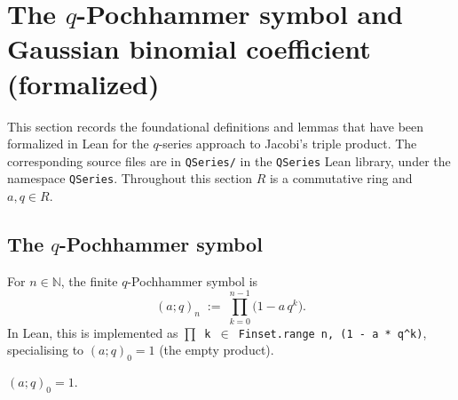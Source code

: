 
\section{The $q$-Pochhammer symbol and Gaussian binomial coefficient (formalized)}
\label{sec:qPochhammer-formalized}

This section records the foundational definitions and lemmas that have been
formalized in Lean for the $q$-series approach to Jacobi's triple product.
The corresponding source files are in \texttt{QSeries/} in the
\texttt{QSeries} Lean library, under the namespace \texttt{QSeries}.
Throughout this section $R$ is a commutative ring and $a, q \in R$.

\subsection{The $q$-Pochhammer symbol}

\begin{definition}\label{def:qPochhammer}\leanok
For $n \in \mathbb{N}$, the finite $q$-Pochhammer symbol is
\[
  (a; q)_n \;:=\; \prod_{k = 0}^{n - 1} \bigl(1 - a\, q^k\bigr).
\]
In Lean, this is implemented as \texttt{$\prod$ k $\in$ Finset.range n, (1 - a * q\^{}k)},
specialising to $(a; q)_0 = 1$ (the empty product).
\end{definition}

\begin{lemma}\label{lem:qPochhammer-zero}\leanok{}
$(a; q)_0 = 1$.
\end{lemma}

